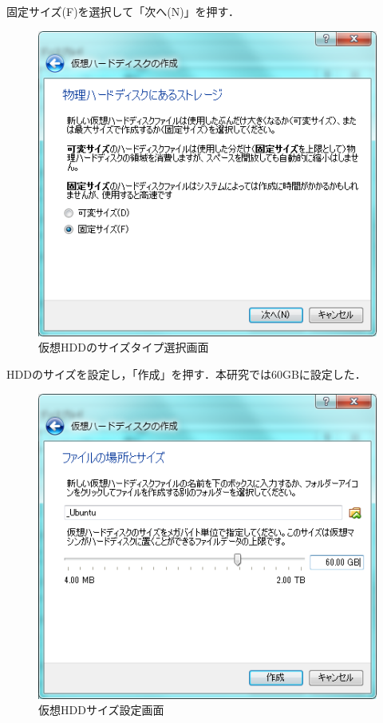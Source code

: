 固定サイズ(F)を選択して「次へ(N)」を押す．

\begin{figure}[H]
\centering
\includegraphics[width=13cm]{vdi_size_kotei.PNG}
\caption{仮想HDDのサイズタイプ選択画面}\label{vdisizekotei}
\end{figure}

HDDのサイズを設定し，「作成」を押す．本研究では60GBに設定した．

\begin{figure}[H]
\centering
\includegraphics[width=13cm]{vdi_size.PNG}
\caption{仮想HDDサイズ設定画面}\label{vdisize}
\end{figure}

